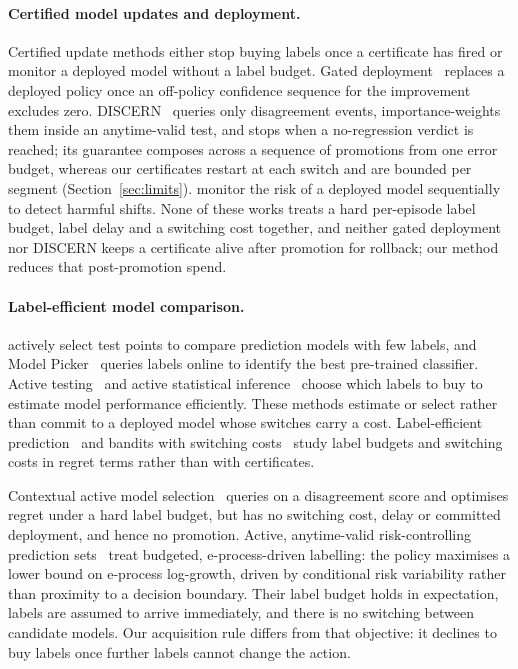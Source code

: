 \documentclass[10pt]{article}
\begin{document}
\paragraph{Certified model updates and deployment.} Certified update methods either stop buying
labels once a certificate has fired or monitor a deployed model without a label budget. Gated
deployment~\citep{karampatziakis2021offpolicy} replaces a deployed policy once an off-policy
confidence sequence for the improvement excludes zero. DISCERN~\citep{balachandran2026discern}
queries only disagreement events, importance-weights them inside an anytime-valid test, and stops
when a no-regression verdict is reached; its guarantee composes across a sequence of promotions
from one error budget, whereas our certificates restart at each switch and are bounded per segment
(Section~\ref{sec:limits}). \citet{podkopaev2022tracking} monitor the risk of a deployed model
sequentially to detect harmful shifts. None of these works treats a hard per-episode label budget,
label delay and a switching cost together, and neither gated deployment nor DISCERN keeps a
certificate alive after promotion for rollback; our method reduces that post-promotion spend.

\paragraph{Label-efficient model comparison.} \citet{sawade2012active} actively select test
points to compare prediction models with few labels, and Model Picker~\citep{karimi2021online}
queries labels online to identify the best pre-trained classifier. Active
testing~\citep{kossen2021active} and active statistical inference~\citep{zrnic2024active} choose
which labels to buy to estimate model performance efficiently. These methods estimate or select
rather than commit to a deployed model whose switches carry a cost. Label-efficient
prediction~\citep{cesabianchi2005minimizing} and bandits with switching
costs~\citep{dekel2014bandits} study label budgets and switching costs in regret terms rather than
with certificates.

Contextual active model selection~\citep{liu2024cams} queries on a disagreement score and
optimises regret under a hard label budget, but has no switching cost, delay or committed
deployment, and hence no promotion. Active, anytime-valid risk-controlling prediction
sets~\citep{xu2024active} treat budgeted, e-process-driven labelling: the policy maximises a lower
bound on e-process log-growth, driven by conditional risk variability rather than proximity to a
decision boundary. Their label budget holds in expectation, labels are assumed to arrive
immediately, and there is no switching between candidate models. Our acquisition rule differs
from that objective: it declines to buy labels once further labels cannot change the action.
\end{document}
